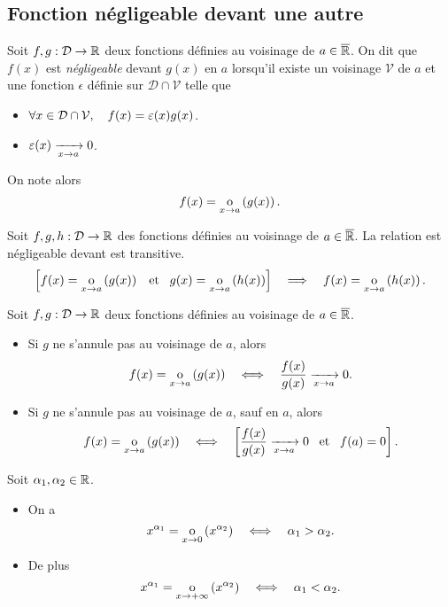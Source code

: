 \documentclass{magnolia}
\begin{document}
\subsection{Fonction négligeable devant une autre}

\begin{definition}[utile=-3]
Soit $f,g:\mathcal{D}\to\mathbb{R}$ deux fonctions définies au voisinage de $a\in\overline{\mathbb{R}}$. On dit
que $f(x)$ est \emph{négligeable} devant $g(x)$ en $a$ lorsqu'il existe un voisinage $\mathcal{V}$ de $a$ et une fonction $\epsilon$ définie sur $\mathcal{D}\cap\mathcal{V}$ telle que
\begin{itemize}
\item $\forall x\in\mathcal{D}\cap\mathcal{V},\quad f(x)=\varepsilon(x)g(x)$.
\item $\varepsilon(x)\xrightarrow[x\rightarrow a]{}0$.
\end{itemize}
On note alors
\[f(x)=\underset{x \rightarrow a}{\text{o}}\left(g(x)\right).\]
\end{definition}

\begin{proposition}[utile=-3]
Soit $f,g,h:\mathcal{D}\to\mathbb{R}$ des fonctions définies au voisinage de $a\in\overline{\mathbb{R}}$. La relation
\og est négligeable devant \fg est transitive.
\[\left[f(x)=\underset{x \rightarrow a}{\text{o}}\left(g(x)\right) \quad\!\text{et}\quad\! g(x)=\underset{x \rightarrow a}{\text{o}}\left(h(x)\right)\right]\quad\Longrightarrow\quad
    f(x)=\underset{x \rightarrow a}{\text{o}}\left(h(x)\right).\]
\end{proposition}

\begin{proposition}[utile=-3]
Soit $f,g:\mathcal{D}\to\mathbb{R}$ deux fonctions définies au voisinage de $a\in\overline{\mathbb{R}}$.
\begin{itemize}
\item Si $g$ ne s'annule pas au voisinage de $a$, alors
  \[f(x)=\underset{x \rightarrow a}{\text{o}}\left(g(x)\right) \quad\Longleftrightarrow\quad
    \frac{f(x)}{g(x)}\xrightarrow[x\rightarrow a]{} 0.\]
\item Si $g$ ne s'annule pas au voisinage de $a$, sauf en $a$, alors
  \[f(x)=\underset{x \rightarrow a}{\text{o}}\left(g(x)\right) \quad\Longleftrightarrow\quad
    \left[\frac{f(x)}{g(x)}\xrightarrow[x\rightarrow a]{} 0 \quad\!\text{et}\quad\! f(a)=0\right].\]
\end{itemize}
\end{proposition}

\begin{proposition}[utile=-3]
Soit $\alpha_1,\alpha_2\in\mathbb{R}$.
\begin{itemize}
\item On a
  \[x^{\alpha_1}=\underset{x \rightarrow 0}{\text{o}}\left(x^{\alpha_2}\right) \quad\Longleftrightarrow\quad \alpha_1 > \alpha_2.\]
\item De plus
  \[x^{\alpha_1}=\underset{x \rightarrow +\infty}{\text{o}}\left(x^{\alpha_2}\right) \quad\Longleftrightarrow\quad
    \alpha_1 < \alpha_2.\]
\end{itemize}
\end{proposition}
\end{document}
